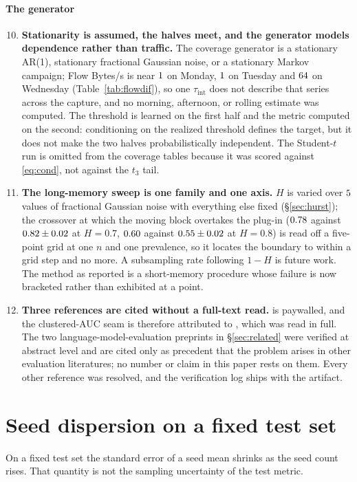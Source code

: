 \documentclass[a4paper,fleqn]{cas-dc}
\newcommand{\tabwidth}{\columnwidth}
\newcommand{\tabbody}{\small\setlength{\tabcolsep}{3.5pt}\renewcommand{\arraystretch}{1.08}}
\newcommand{\onetab}{\renewcommand{\tabwidth}{\columnwidth}\tabbody}
\begin{document}
\paragraph{The generator}
\begin{enumerate}\setcounter{enumi}{9}
\item \textbf{Stationarity is assumed, the halves meet, and the generator models dependence rather
  than traffic.} The coverage generator is a stationary AR(1), stationary fractional Gaussian
  noise, or a stationary Markov campaign; Flow Bytes/s is near $1$ on Monday,
  $1$ on Tuesday and $64$ on Wednesday (Table~\ref{tab:flowdif}), so one
  $\tau_{\mathrm{int}}$ does not describe that series across the capture, and no morning,
  afternoon, or rolling estimate was computed. The threshold is learned on the first half and the
  metric computed on the second: conditioning on the realized threshold defines the target, but it
  does not make the two halves probabilistically independent. The Student-$t$ run is omitted from
  the coverage tables because it was scored against \eqref{eq:cond}, not against the $t_3$ tail.
\item \textbf{The long-memory sweep is one family and one axis.} $H$ is varied over $5$
  values of fractional Gaussian noise with everything else fixed (\S\ref{sec:hurst}); the
  crossover at which the moving block overtakes the plug-in ($0.78$ against $0.82\pm0.02$ at
  $H{=}0.7$, $0.60$ against $0.55\pm0.02$ at $H{=}0.8$) is read off a five-point grid at one
  $n$ and one prevalence, so it locates the boundary to within a grid step and no more. A
  subsampling rate following $1-H$ is future work. The method as reported is a short-memory
  procedure whose failure is now bracketed rather than exhibited at a point.
\item \textbf{Three references are cited without a full-text read.} \citet{obuchowski1997nonparametric} is
  paywalled, and the clustered-AUC seam is therefore attributed to \citet{bay2023dependency}, which was
  read in full. The two language-model-evaluation preprints in \S\ref{sec:related} were verified at
  abstract level and are cited only as precedent that the problem arises in other evaluation
  literatures; no number or claim in this paper rests on them. Every other reference was resolved,
  and the verification log ships with the artifact.
\end{enumerate}

\section{Seed dispersion on a fixed test set}\label{app:seed}
On a fixed test set the standard error of a seed mean shrinks as the seed count rises. That quantity is not the sampling uncertainty of the test metric.
\begin{table}[ht]
\centering
\caption{Seed standard error vs.\ true test-set sampling standard deviation, by seed count $K$
(fixed test set). From \texttt{diagnostics/seed\_vs\_testset.py}.}\label{tab:sf2sim}
\onetab

\end{table}
\end{document}
